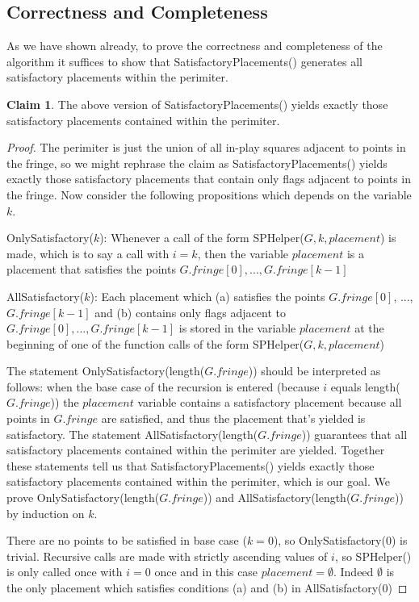\documentclass{article}
\theoremstyle{definition}
\theoremstyle{definition}
\theoremstyle{theorem}
\newtheorem{claim}{Claim}
\begin{document}
	\subsection*{Correctness and Completeness}
	As we have shown already, to prove the correctness and completeness of the algorithm it suffices to show that SatisfactoryPlacements() generates all satisfactory placements within the perimiter.
	\begin{claim}
		The above version of SatisfactoryPlacements() yields exactly those satisfactory placements contained within the perimiter.
	\end{claim}
	\begin{proof}
		The perimiter is just the union of all in-play squares adjacent to points in the fringe, so we might rephrase the claim as SatisfactoryPlacements() yields exactly those satisfactory placements that contain only flags adjacent to points in the fringe. Now consider the following propositions which depends on the variable $k$.
		
		\bigskip
		OnlySatisfactory($k$): Whenever a call of the form SPHelper($G,k,placement$) is made, which is to say a call with $i = k$, then the variable $placement$ is a placement that satisfies the points $G.fringe[0],...,G.fringe[k-1]$
	
		\bigskip
		 AllSatisfactory($k$): Each placement which (a) satisfies the points $G.fringe[0]$, ...,$G.fringe[k-1]$ and (b) contains only flags adjacent to $G.fringe[0], ..., G.fringe[k-1]$ is stored in the variable $placement$ at the beginning of one of the function calls of the form SPHelper($G,k,placement$)
		 
		 \bigskip
		 The statement OnlySatisfactory(length($G.fringe$)) should be interpreted as follows: when the base case of the recursion is entered (because $i$ equals length($G.fringe$)) the $placement$ variable contains a satisfactory placement because all points in $G.fringe$ are satisfied, and thus the placement that's yielded is satisfactory. The statement AllSatisfactory(length($G.fringe$)) guarantees  that all satisfactory placements contained within the perimiter are yielded. Together these statements tell us that SatisfactoryPlacements() yields exactly those satisfactory placements contained within the perimiter, which is our goal. We prove OnlySatisfactory(length($G.fringe$)) and AllSatisfactory(length($G.fringe$)) by induction on $k$.
		 
		There are no points to be satisfied in base case ($k = 0$), so OnlySatisfactory(0) is trivial. Recursive calls are made with strictly ascending values of $i$, so SPHelper() is only called once with $i = 0$ once and in this  case $placement = \emptyset$. Indeed $\emptyset$ is the only placement which satisfies conditions (a) and (b) in AllSatisfactory(0)
		

\end{proof}
\end{document}
